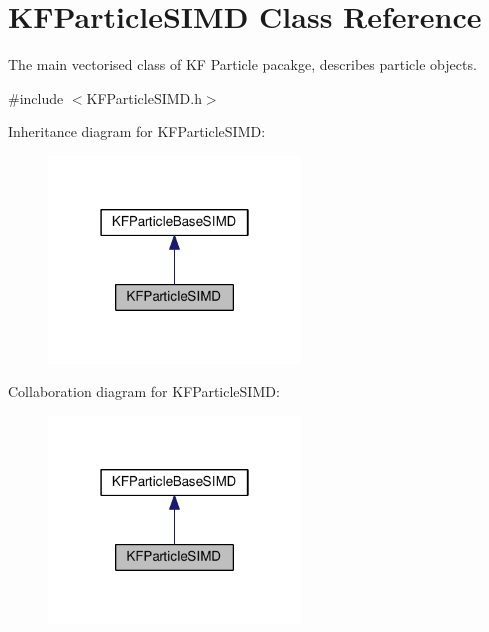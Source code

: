 \hypertarget{classKFParticleSIMD}{}\section{K\+F\+Particle\+S\+I\+MD Class Reference}
\label{classKFParticleSIMD}


The main vectorised class of KF Particle pacakge, describes particle objects.  




{\ttfamily \#include $<$K\+F\+Particle\+S\+I\+M\+D.\+h$>$}



Inheritance diagram for K\+F\+Particle\+S\+I\+MD\+:\nopagebreak
\begin{figure}[H]
\begin{center}
\leavevmode
\includegraphics[width=190pt]{classKFParticleSIMD__inherit__graph}
\end{center}
\end{figure}


Collaboration diagram for K\+F\+Particle\+S\+I\+MD\+:\nopagebreak
\begin{figure}[H]
\begin{center}
\leavevmode
\includegraphics[width=190pt]{classKFParticleSIMD__coll__graph}
\end{center}
\end{figure}
